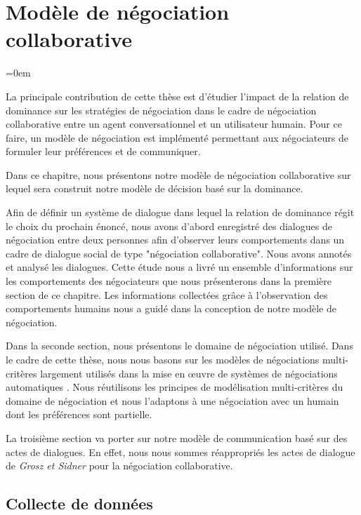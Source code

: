 	\chapter{Modèle de négociation collaborative}
	\label{chap:chap3}
	\begingroup
	\parindent=0em
	\localtableofcontents 
	\clearpage
	\endgroup
	
	La principale contribution de cette thèse est d'étudier l'impact de la relation de dominance sur les stratégies de négociation dans le cadre de négociation collaborative entre un agent conversationnel et un utilisateur humain. 
	Pour ce faire, un modèle de négociation est implémenté permettant aux négociateurs de formuler leur préférences et de communiquer. 
	
	Dans ce chapitre, nous présentons notre modèle de négociation collaborative sur lequel sera construit notre modèle de décision basé sur la dominance. 
	
	Afin de définir un système de dialogue dans lequel la relation de dominance régit le choix du prochain énoncé, nous avons d'abord enregistré des dialogues de négociation entre deux personnes afin d'observer leurs comportements dans un cadre de dialogue social de type "négociation collaborative". Nous avons annotés et analysé les dialogues. Cette étude nous a livré un ensemble d'informations sur les comportements des négociateurs que nous présenterons dans la première section de ce chapitre. 
	Les informations collectées grâce à l'observation des comportements humains nous a guidé dans la conception de notre modèle de négociation.
	
	Dans la seconde section, nous présentons le domaine de négociation utilisé. Dans le cadre de cette thèse, nous nous basons sur les modèles de négociations multi-critères largement utilisés dans la mise en œuvre de systèmes de négociations automatiques \cite{jonker2007agent,lai2004literature,lai2008decentralized}. Nous réutilisons les principes de modélisation multi-critères du domaine de négociation et nous l'adaptons à une négociation avec un humain dont les préférences sont partielle.  
	
	La troisième section va porter sur notre modèle de communication basé sur des actes de dialogues. En effet, nous nous sommes réappropriés les actes de dialogue de \emph{Grosz et Sidner} \cite{grosz1986attention} pour la négociation collaborative.
	
	
	 \section{Collecte de données}
	
